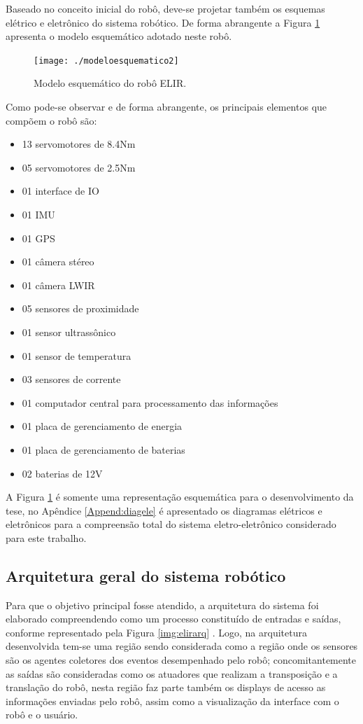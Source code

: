 Baseado no conceito inicial do robô, deve-se projetar também os esquemas elétrico e eletrônico do sistema robótico. De forma abrangente a Figura \ref{img:elirmodesq} apresenta o modelo esquemático adotado neste robô.

\begin{figure} [h!]	
	\caption{Modelo esquemático do robô ELIR.}
	\label{img:elirmodesq}											 
	\centering													 
	\texttt{[image: ./modeloesquematico2]}
\end{figure}													 

Como pode-se observar e de forma abrangente, os principais elementos que compõem o robô são:

\begin{itemize}
	\item 13 servomotores de 8.4Nm
	\item 05 servomotores de 2.5Nm
	\item 01 interface de IO
	\item 01 IMU
	\item 01 GPS
	\item 01 câmera stéreo
	\item 01 câmera LWIR
	\item 05 sensores de proximidade
	\item 01 sensor ultrassônico
	\item 01 sensor de temperatura
	\item 03 sensores de corrente
	\item 01 computador central para processamento das informações
	\item 01 placa de gerenciamento de energia
	\item 01 placa de gerenciamento de baterias
	\item 02 baterias de 12V
\end{itemize}

A Figura \ref{img:elirmodesq} é somente uma representação esquemática para o desenvolvimento da tese, no Apêndice \ref{Append:diagele} é apresentado os diagramas elétricos e eletrônicos para a compreensão total do sistema eletro-eletrônico considerado para este trabalho.


\subsection{Arquitetura geral do sistema robótico}
\label{ssec:arqg}
Para que o objetivo principal fosse atendido, a arquitetura do sistema foi elaborado compreendendo como um processo constituído de entradas e saídas, conforme representado pela Figura \ref{img:elirarq} . Logo, na arquitetura desenvolvida tem-se uma região sendo considerada como a região onde os sensores são os agentes coletores dos eventos desempenhado pelo robô; concomitantemente as saídas são consideradas como os atuadores que realizam a transposição e a translação do robô, nesta região faz parte também os displays de acesso as informações enviadas pelo robô, assim como a visualização da interface com o robô e o usuário.

